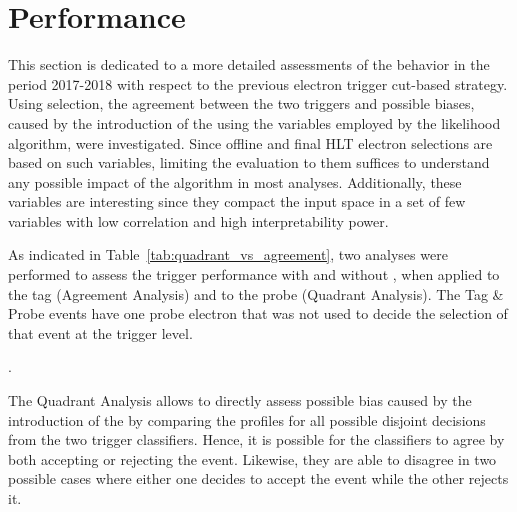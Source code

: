 
\section{\rnn{} Performance}%
\label{sec:off_ana}

This section is dedicated to a more detailed assessments of the \rnn{} behavior 
in the period 2017-2018 with respect to the previous electron trigger cut-based strategy.
Using \Zee{} \tnp{} selection, the agreement between the two triggers and
possible biases, caused by the introduction of the \rnn{} using the variables
employed by the likelihood algorithm, were investigated.
Since offline and final HLT electron
selections are based on such variables, limiting the evaluation to them suffices
to understand any possible impact of the \rnn{} algorithm in most analyses.
Additionally, these variables are interesting since they compact the input space
in a set of few variables with low correlation and high interpretability power. 

As indicated in Table~\ref{tab:quadrant_vs_agreement}, two analyses were performed to assess the
trigger performance with and without \rnn{}, when applied to the tag (Agreement Analysis) and
to the probe (Quadrant Analysis). The Tag \& Probe events have one probe electron that was not 
used to decide the selection of that event at the trigger level.


\begin{table}[ht!]\footnotesize
\centering
\caption{Customized \Zee{} \tap{} selection criteria employed in the
agreement and quadrant analyses in the Run 2 (2017-2018 period)}.%
\label{tab:quadrant_vs_agreement}
\end{table}

The Quadrant Analysis allows to directly assess possible bias caused by the
introduction of the \rnn{} by comparing the profiles for all possible disjoint
decisions from the two trigger classifiers. Hence, it is possible for the classifiers
to agree by both accepting or rejecting the event. Likewise, they are able to
disagree in two possible cases where either one decides to accept the event
while the other rejects it.

